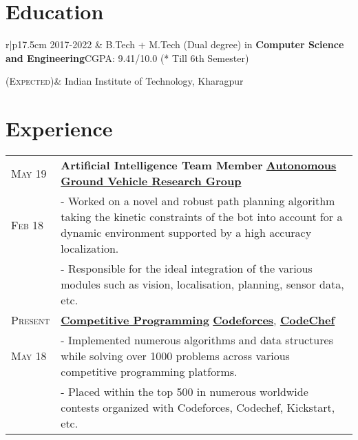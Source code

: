 \documentclass[a4paper,10pt]{extarticle} %
\begin{document}
\section{\textcolor{primary}{Education}}
\begin{tabular}{r|p{17.5cm}}	
2017-2022 & B.Tech + M.Tech (Dual degree) in \textbf{Computer Science and Engineering}\hfill\textsc{CGPA: } 9.41/10.0 (* Till 6th Semester)\\
\vspace{0.2cm}

\textsc{(Expected)}& Indian Institute of Technology, Kharagpur \hfill\\

\end{tabular}

\vspace{-0.35cm}
\section{\textcolor{primary}{Experience}}
\begin{tabularx}{\linewidth}{ l | X }
\textsc{May 19} & \textbf{Artificial Intelligence Team Member} \hfill\href{http://www.agv.iitkgp.ac.in/}{\textbf{Autonomous Ground Vehicle Research Group}}\\
\textsc{Feb 18} & {- Worked on a novel and robust path planning algorithm taking the kinetic constraints of the bot into account for a dynamic environment supported by a high accuracy localization.}\\
\vspace{0.1cm}
& {- Responsible for the ideal integration of the various modules such as vision, localisation, planning, sensor data, etc.} \\
\textsc{Present} & \href{https://github.com/TheLethalCode/Competitive-Programming}{\textbf{Competitive Programming}} \hfill\href{https://codeforces.com/profile/TheLethalCode}{\textbf{Codeforces}}, \href{https://www.codechef.com/users/thelethalcode}{\textbf{CodeChef}}\\
\textsc{May 18} & {- Implemented numerous algorithms and data structures while solving over 1000 problems across various competitive programming platforms.}\\
& {- Placed within the top 500 in numerous worldwide contests organized with Codeforces, Codechef, Kickstart, etc. }
\end{tabularx}
\end{document}
